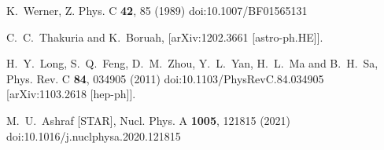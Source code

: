 \begin{thebibliography}{99}
K.~Werner,
Z. Phys. C \textbf{42}, 85 (1989)
doi:10.1007/BF01565131



C.~C.~Thakuria and K.~Boruah,
[arXiv:1202.3661 [astro-ph.HE]].

H.~Y.~Long, S.~Q.~Feng, D.~M.~Zhou, Y.~L.~Yan, H.~L.~Ma and B.~H.~Sa,
Phys. Rev. C \textbf{84}, 034905 (2011)
doi:10.1103/PhysRevC.84.034905
[arXiv:1103.2618 [hep-ph]].

M.~U.~Ashraf [STAR],
Nucl. Phys. A \textbf{1005}, 121815 (2021)
doi:10.1016/j.nuclphysa.2020.121815







\end{thebibliography}